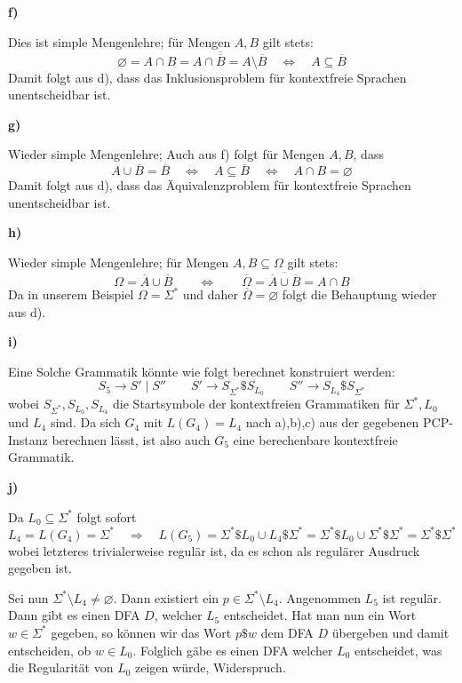 \documentclass[a4paper,graphics,11pt]{article}
\begin{document}
\strut

\textbf{f)}

Dies ist simple Mengenlehre; für Mengen $A,B$ gilt stets:
$$
    \varnothing
    = A \cap B
    = A \cap \overline{\overline{B}}
    = A \setminus \overline{B}
    \quad\iff\quad
    A \subseteq \overline{B}
$$
Damit folgt aus d), dass das Inklusionsproblem für kontextfreie Sprachen unentscheidbar ist.

\strut

\textbf{g)}

Wieder simple Mengenlehre; Auch aus f) folgt für Mengen $A,B$, dass
$$
    A \cup \overline{B} = \overline{B}
    \quad\iff\quad
    A \subseteq \overline{B}
    \quad\iff\quad
    A \cap B = \varnothing
$$
Damit folgt aus d), dass das Äquivalenzproblem für kontextfreie Sprachen unentscheidbar ist.

\strut

\textbf{h)}

Wieder simple Mengenlehre; für Mengen $A,B \subseteq \Omega$ gilt stets:
$$
    \Omega = \overline{A} \cup \overline{B}
    \qquad\iff\qquad
    \overline{\Omega} = \overline{\overline{A} \cup \overline{B}} = A \cap B
$$
Da in unserem Beispiel $\Omega = \Sigma^*$ und daher $\overline{\Omega} = \varnothing$ folgt die Behauptung
wieder aus d).

\newpage

\textbf{i)}

Eine Solche Grammatik könnte wie folgt berechnet konstruiert werden:
$$
    S_5 \to S' \mid S''
    \qquad
    S' \to S_{\Sigma^*}\$S_{L_0}
    \qquad
    S'' \to S_{L_4}\$S_{\Sigma^*}
$$
wobei $S_{\Sigma^*}, S_{L_0}, S_{L_4}$ die Startsymbole der kontextfreien Grammatiken für $\Sigma^*, L_0$ und $L_4$
sind. Da sich $G_4$ mit $L(G_4) = L_4$ nach a),b),c) aus der gegebenen PCP-Instanz berechnen lässt,
ist also auch $G_5$ eine berechenbare kontextfreie Grammatik.

\strut

\textbf{j)}

Da $L_0 \subseteq \Sigma^*$ folgt sofort
$$
    L_4 = L(G_4) = \Sigma^*
    \quad\Longrightarrow\quad L(G_5) = \Sigma^*\$L_0 \cup L_4\$\Sigma^* = \Sigma^*\$L_0 \cup \Sigma^*\$\Sigma^*
    = \Sigma^*\$\Sigma^*
$$
wobei letzteres trivialerweise regulär ist, da es schon als regulärer Ausdruck gegeben ist.

Sei nun $\Sigma^* \setminus L_4 \neq \varnothing$. Dann existiert ein $p \in \Sigma^* \setminus L_4$.
Angenommen $L_5$ ist regulär. Dann gibt es einen DFA $D$, welcher $L_5$ entscheidet.
Hat man nun ein Wort $w \in \Sigma^*$ gegeben, so können wir das Wort $p\$w$ dem DFA $D$ übergeben
und damit entscheiden, ob $w \in L_0$. Folglich gäbe es einen DFA welcher $L_0$ entscheidet, was
die Regularität von $L_0$ zeigen würde, Widerspruch.
\end{document}
